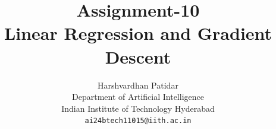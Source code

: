\documentclass{article}
\title{Assignment-10 \\ Linear Regression and Gradient Descent}
\author{Harshvardhan Patidar\\
  Department of Artificial Intelligence\\
  Indian Institute of Technology Hyderabad\\
  \texttt{ai24btech11015@iith.ac.in}
}
\begin{document}
\



\maketitle






















\end{document}
